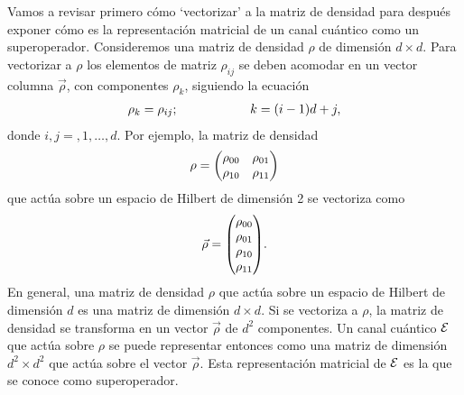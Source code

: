 Vamos a revisar primero cómo `vectorizar' a la matriz de densidad 
para después exponer cómo es la representación matricial de
un canal cuántico como un superoperador.
Consideremos una matriz de densidad $\rho$ de dimensión $d\times d$.
Para vectorizar a $\rho$ los elementos de matriz $\rho_{ij}$ 
se deben acomodar en un vector columna $\vec{\rho}$, con componentes 
$\rho_k$, siguiendo la ecuación  
\begin{align}
\rho_k=\rho_{ij};\hspace{2cm} k=\qty(i-1)d+j,
\label{eq:matrix-to-vector}
\end{align}
donde $i,j=,1,\ldots,d$. Por ejemplo, la matriz de densidad
\begin{align}
\rho=\mqty(\rho_{00}&\rho_{01}\\ \rho_{10}&\rho_{11})
\end{align}
que actúa sobre un espacio de Hilbert de dimensión 2 se vectoriza como 
\begin{align}
\vec{\rho}=\mqty(\rho_{00}\\ \rho_{01}\\ \rho_{10}\\ \rho_{11}).
\end{align}
En general, una matriz de densidad $\rho$ que actúa 
sobre un espacio de Hilbert de dimensión $d$ es 
una matriz de dimensión $d\times d$. Si se vectoriza a $\rho$, la matriz 
de densidad se transforma en un vector $\vec{\rho}$ de $d^2$ 
componentes. Un canal cuántico $\mathcal{E}$ que actúa sobre $\rho$ se puede
representar entonces como una matriz de dimensión $d^2\times d^2$ 
que actúa sobre el vector $\vec{\rho}$. Esta representación matricial de 
$\mathcal{E}$ es la que se conoce como superoperador.

